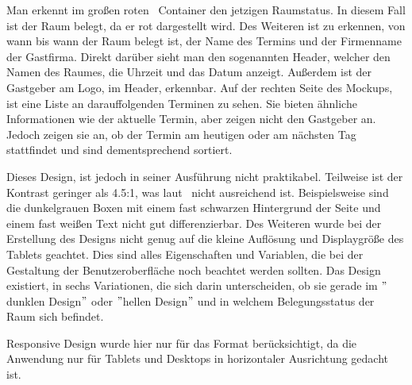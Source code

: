 Man erkennt im großen roten ~\gls{Container} den jetzigen Raumstatus.
In diesem Fall ist der Raum belegt, da er rot dargestellt wird.
Des Weiteren ist zu erkennen, von wann bis wann der Raum belegt ist, der Name des Termins und der Firmenname der Gastfirma.
\newline
{}
Direkt darüber sieht man den sogenannten \gls{Header}, welcher den Namen des Raumes, die Uhrzeit und das Datum anzeigt.
Außerdem ist der Gastgeber am Logo, im Header, erkennbar.
\newline
Auf der rechten Seite des Mockups, ist eine Liste an darauffolgenden Terminen zu sehen.
Sie bieten ähnliche Informationen wie der aktuelle Termin, aber zeigen nicht den Gastgeber an.
Jedoch zeigen sie an, ob der Termin am heutigen oder am nächsten Tag stattfindet und sind dementsprechend sortiert.
\newline
\newline

Dieses Design, ist jedoch in seiner Ausführung nicht praktikabel.
Teilweise ist der Kontrast geringer als 4.5:1, was laut~\cite{WCAG} nicht ausreichend ist.
Beispielsweise sind die dunkelgrauen Boxen mit einem fast schwarzen Hintergrund der Seite und einem fast weißen Text nicht gut differenzierbar.
Des Weiteren wurde bei der Erstellung des Designs nicht genug auf die kleine Auflösung und Displaygröße des Tablets geachtet.
Dies sind alles Eigenschaften und Variablen, die bei der Gestaltung der Benutzeroberfläche noch beachtet werden sollten.
\newline
Das Design existiert, in sechs Variationen, die sich darin unterscheiden, ob sie gerade im \("\)dunklen Design\("\) oder \("\)hellen Design\("\) und in welchem Belegungsstatus der Raum sich befindet.
\newline
{}

\gls{Responsive Design} wurde hier nur für das Format berücksichtigt, da die Anwendung nur für Tablets und Desktops in horizontaler Ausrichtung gedacht ist.

